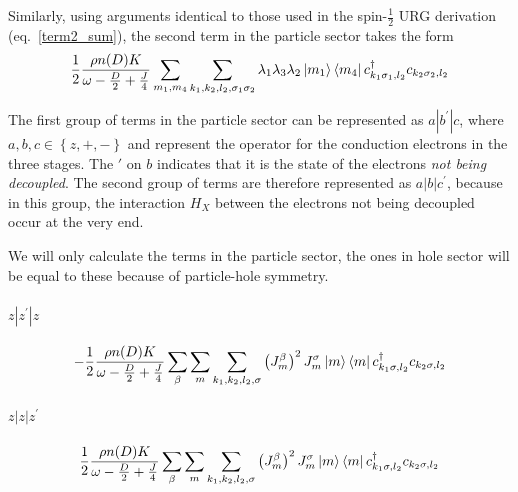\documentclass[12pt]{revtex4-2}
\begin{document}
Similarly, using arguments identical to those used in the spin-\(\frac{1}{2}\) URG derivation (eq.~\ref{term2_sum}), the second term in the particle sector takes the form
\begin{equation}\begin{aligned}
	\frac{1}{2}\frac{\rho n(D) K}{\omega - \frac{D}{2} + \frac{J}{4}}\sum_{m_1,m_4}\sum_{k_1,k_2,l_2,\sigma_1\sigma_2}\lambda_{1}\lambda_{3}\lambda_{2}\ket{m_1}\bra{m_4}c^\dagger_{k_1 \sigma_1, l_2}c_{k_2 \sigma_2,l_2}
\end{aligned}\end{equation}

The first group of terms in the particle sector can be represented as \(a|b^\prime|c\), where \(a,b,c \in \left\{z,+,-\right\} \) and represent the operator for the conduction electrons in the three stages. The \(\prime\) on \(b\) indicates that it is the state of the electrons \textit{not being decoupled}. The second group of terms are therefore represented as \(a|b|c^\prime\), because in this group, the interaction \(H_X\) between the electrons not being decoupled occur at the very end.

We will only calculate the terms in the particle sector, the ones in hole sector will be equal to these because of particle-hole symmetry.
\paragraph{\(z|z^\prime|z\)}
\begin{equation}\begin{aligned}
	- \frac{1}{2}\frac{\rho n(D) K}{\omega - \frac{D}{2} + \frac{J}{4}}\sum_\beta \sum_{m}\sum_{k_1,k_2,l_2,\sigma} \left(J^\beta_m\right)^2 J^\sigma_m \ket{m}\bra{m}c^\dagger_{k_1 \sigma, l_2}c_{k_2 \sigma,l_2}
\end{aligned}\end{equation}

\paragraph{\(z|z|z^\prime\)}
\begin{equation}\begin{aligned}
	\frac{1}{2}\frac{\rho n(D) K}{\omega - \frac{D}{2} + \frac{J}{4}}\sum_\beta \sum_{m}\sum_{k_1,k_2,l_2,\sigma} \left(J^\beta_m\right)^2 J^\sigma_m \ket{m}\bra{m}c^\dagger_{k_1 \sigma, l_2}c_{k_2 \sigma,l_2}
\end{aligned}\end{equation}
\end{document}
